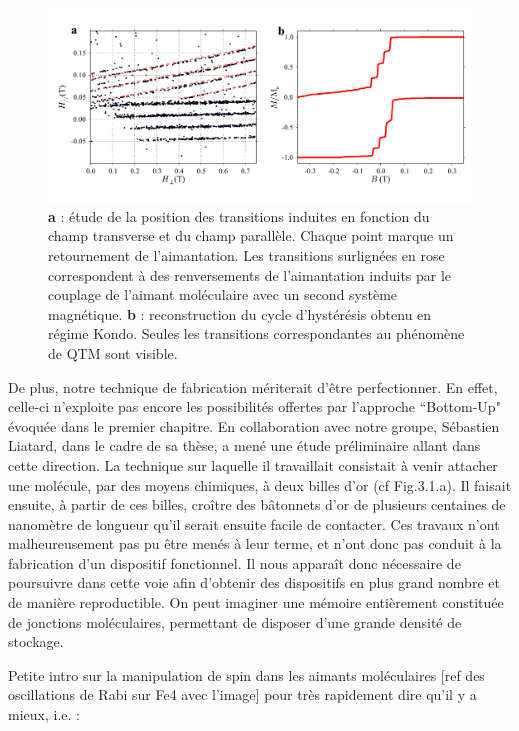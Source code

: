 \begin{figure}[h!]
\includegraphics[scale=0.45]{Conclusion/TranInd/TransInd.pdf} 
\caption{\textbf{a} : étude de la position des transitions induites en fonction du champ transverse et du champ parallèle. Chaque point marque un retournement de l'aimantation. Les transitions surlignées en rose correspondent à des renversements de l'aimantation induits par le couplage de l'aimant moléculaire avec un second système magnétique. \textbf{b} : reconstruction du cycle d'hystérésis obtenu en régime Kondo. Seules les transitions correspondantes au phénomène de QTM sont visible.}
\label{TransIndConcl}
\end{figure}



De plus, notre technique de fabrication mériterait d'être perfectionner. En effet, celle-ci n'exploite pas encore les possibilités offertes par l'approche ``Bottom-Up" évoquée dans le premier chapitre. En collaboration avec notre groupe, Sébastien Liatard, dans le cadre de sa thèse, a mené une étude préliminaire allant dans cette direction. La technique sur laquelle il travaillait consistait à venir attacher une molécule, par des moyens chimiques, à deux billes d'or (cf Fig.3.1.a). Il faisait ensuite, à partir de ces billes, croître des bâtonnets d'or de plusieurs centaines de nanomètre de longueur qu'il serait ensuite facile de contacter. Ces travaux n'ont malheureusement pas pu être menés à leur terme, et n'ont donc pas conduit à la fabrication d'un dispositif fonctionnel. Il nous apparaît donc nécessaire de poursuivre dans cette voie afin d'obtenir des dispositifs en plus grand nombre et de manière reproductible. On peut imaginer une mémoire entièrement constituée de jonctions moléculaires, permettant de disposer d'une grande densité de stockage.




Petite intro sur la manipulation de spin dans les aimants moléculaires [ref des oscillations de Rabi sur Fe4 avec l'image] pour très rapidement dire qu'il y a mieux, i.e. :


